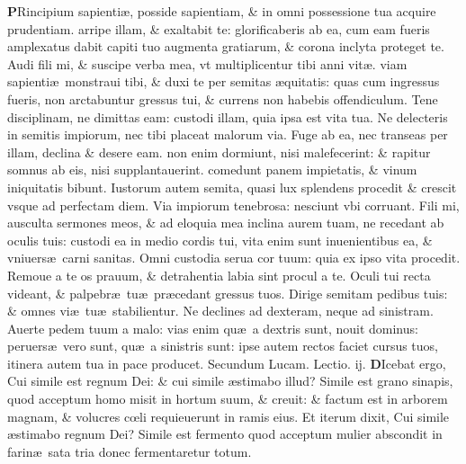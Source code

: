 \documentclass[a5paper,10pt]{book}
\def\leftmarginnote{%
	\lrmarginnote{\hskip -\marginparsep \hskip -6.5em}}
\def\rightmarginnote{%
	\lrmarginnote{\hskip\columnwidth \hskip -1em}}
\def\ae{æ}
\def\oe{œ}
\begin{document}
\begin{multicols*}{2}
\vspace{-2.25em}
\lettrine[lines=2]{\bfseries P}{}Rincipium\rightmarginnote{ca. 4.} sapienti\ae , posside sapientiam, \& in omni possessione tua acquire prudentiam.
arripe illam, \& exaltabit te: glorificaberis ab ea, cum eam fueris amplexatus dabit capiti tuo augmenta gratiarum, \& corona inclyta proteget te.
Audi fili mi, \& suscipe verba mea, vt multiplicentur tibi anni vit\ae . viam sapienti\ae \ monstraui tibi, \& duxi te per semitas \ae quitatis: quas cum ingressus fueris, non arctabuntur gressus tui, \& currens non habebis offendiculum.
Tene disciplinam, ne dimittas eam: custodi illam, quia ipsa est vita tua.
Ne delecteris in semitis impiorum, nec tibi placeat malorum via. Fuge ab ea, nec transeas per illam, declina \& desere eam.
non enim dormiunt, nisi malefecerint: \& rapitur somnus ab eis, nisi supplantauerint. comedunt panem impietatis, \& vinum iniquitatis bibunt.
Iustorum autem semita, quasi lux splendens procedit \& crescit vsque ad perfectam diem.
Via impiorum tenebrosa: nesciunt vbi corruant.
Fili mi,
ausculta sermones meos, \& ad eloquia mea inclina aurem tuam, ne recedant ab oculis tuis: custodi ea in medio cordis tui, vita enim sunt inuenientibus ea, \& vniuers\ae \ carni sanitas.
Omni custodia serua cor tuum: quia ex ipso vita procedit. Remoue a te os prauum, \& detrahentia labia sint procul a te.
Oculi tui recta videant, \& palpebr\ae \ tu\ae \ pr\ae cedant gressus tuos.
Dirige semitam pedibus tuis: \& omnes vi\ae \ tu\ae \ stabilientur.
Ne declines ad dexteram, neque ad sinistram. Auerte pedem tuum a malo: vias enim qu\ae \ a dextris sunt, nouit dominus: peruers\ae \ vero sunt, qu\ae \ a sinistris sunt: ipse autem rectos faciet cursus tuos, itinera autem tua in pace producet.
\fancyhead[C]{\color{red} Feria. vj. Dominic\ae . j. post aduentum}
\newline \color{red} Secundum Lucam. \hfill Lectio. ij. \color{black}
\vspace{-.25em}
\lettrine[lines=2]{\bfseries \color{red} D}{}Icebat\leftmarginnote{\begin{flushright}c. 13.\end{flushright}} ergo, Cui simile est regnum Dei: \& cui simile \ae stimabo illud?
Simile est grano sinapis, quod acceptum homo misit in hortum suum, \& creuit: \& factum est in arborem magnam, \& volucres c\oe li requieuerunt in ramis eius.
Et iterum dixit, Cui simile \ae stimabo regnum Dei?
Simile est fermento quod acceptum mulier abscondit in farin\ae \ sata tria donec fermentaretur totum.

\end{multicols*}
\end{document}
